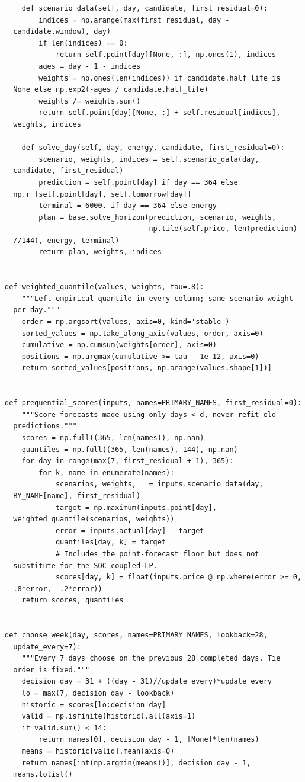 \begin{verbatim}
    def scenario_data(self, day, candidate, first_residual=0):
        indices = np.arange(max(first_residual, day -
  candidate.window), day)
        if len(indices) == 0:
            return self.point[day][None, :], np.ones(1), indices
        ages = day - 1 - indices
        weights = np.ones(len(indices)) if candidate.half_life is
  None else np.exp2(-ages / candidate.half_life)
        weights /= weights.sum()
        return self.point[day][None, :] + self.residual[indices],
  weights, indices

    def solve_day(self, day, energy, candidate, first_residual=0):
        scenario, weights, indices = self.scenario_data(day,
  candidate, first_residual)
        prediction = self.point[day] if day == 364 else
  np.r_[self.point[day], self.tomorrow[day]]
        terminal = 6000. if day == 364 else energy
        plan = base.solve_horizon(prediction, scenario, weights,
                                  np.tile(self.price, len(prediction)
  //144), energy, terminal)
        return plan, weights, indices


def weighted_quantile(values, weights, tau=.8):
    """Left empirical quantile in every column; same scenario weight
  per day."""
    order = np.argsort(values, axis=0, kind='stable')
    sorted_values = np.take_along_axis(values, order, axis=0)
    cumulative = np.cumsum(weights[order], axis=0)
    positions = np.argmax(cumulative >= tau - 1e-12, axis=0)
    return sorted_values[positions, np.arange(values.shape[1])]


def prequential_scores(inputs, names=PRIMARY_NAMES, first_residual=0):
    """Score forecasts made using only days < d, never refit old
  predictions."""
    scores = np.full((365, len(names)), np.nan)
    quantiles = np.full((365, len(names), 144), np.nan)
    for day in range(max(7, first_residual + 1), 365):
        for k, name in enumerate(names):
            scenarios, weights, _ = inputs.scenario_data(day,
  BY_NAME[name], first_residual)
            target = np.maximum(inputs.point[day],
  weighted_quantile(scenarios, weights))
            error = inputs.actual[day] - target
            quantiles[day, k] = target
            # Includes the point-forecast floor but does not
  substitute for the SOC-coupled LP.
            scores[day, k] = float(inputs.price @ np.where(error >= 0,
  .8*error, -.2*error))
    return scores, quantiles


def choose_week(day, scores, names=PRIMARY_NAMES, lookback=28,
  update_every=7):
    """Every 7 days choose on the previous 28 completed days. Tie
  order is fixed."""
    decision_day = 31 + ((day - 31)//update_every)*update_every
    lo = max(7, decision_day - lookback)
    historic = scores[lo:decision_day]
    valid = np.isfinite(historic).all(axis=1)
    if valid.sum() < 14:
        return names[0], decision_day - 1, [None]*len(names)
    means = historic[valid].mean(axis=0)
    return names[int(np.argmin(means))], decision_day - 1,
  means.tolist()
\end{verbatim}

